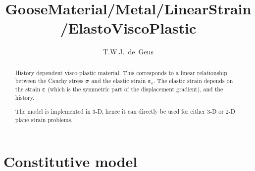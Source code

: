 \documentclass[times,namecite]{goose-article}
\title{%
  GooseMaterial/Metal/LinearStrain/ElastoViscoPlastic
}
\author{T.W.J.~de~Geus}
\begin{document}
\maketitle

\begin{abstract}
History dependent visco-plastic material. This corresponds to a linear relationship between the Cauchy stress $\bm{\sigma}$ and the elastic strain $\bm{\varepsilon}_\mathrm{e}$. The elastic strain depends on the strain $\bm{\varepsilon}$ (which is the symmetric part of the displacement gradient), and the history.

The model is implemented in 3-D, hence it can directly be used for either 3-D or 2-D plane strain problems.
\end{abstract}


\setcounter{tocdepth}{2}
\tableofcontents

\vfill\newpage
\section{Constitutive model}
\end{document}

